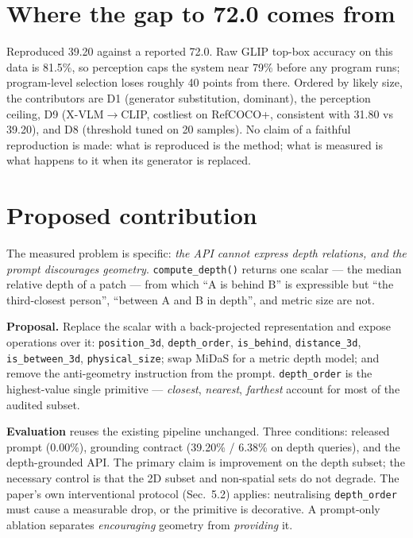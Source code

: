 \documentclass[11pt,a4paper]{article}
\begin{document}
\section{Where the gap to 72.0 comes from}

Reproduced 39.20 against a reported 72.0. Raw GLIP top-box accuracy on this data is
81.5\%, so perception caps the system near 79\% before any program runs; program-level
selection loses roughly 40 points from there. Ordered by likely size, the
contributors are D1 (generator substitution, dominant), the perception ceiling,
D9 (X-VLM$\rightarrow$CLIP, costliest on RefCOCO+, consistent with 31.80 vs 39.20),
and D8 (threshold tuned on 20 samples). No claim of a faithful reproduction is made:
what is reproduced is the method; what is measured is what happens to it when its
generator is replaced.

\section{Proposed contribution}

The measured problem is specific: \emph{the API cannot express depth relations, and
the prompt discourages geometry}. \texttt{compute\_depth()} returns one scalar --- the
median relative depth of a patch --- from which ``A is behind B'' is expressible but
``the third-closest person'', ``between A and B in depth'', and metric size are not.

\textbf{Proposal.} Replace the scalar with a back-projected representation and expose
operations over it: \texttt{position\_3d}, \texttt{depth\_order},
\texttt{is\_behind}, \texttt{distance\_3d}, \texttt{is\_between\_3d},
\texttt{physical\_size}; swap MiDaS for a metric depth model; and remove the
anti-geometry instruction from the prompt. \texttt{depth\_order} is the
highest-value single primitive --- \emph{closest}, \emph{nearest}, \emph{farthest}
account for most of the audited subset.

\textbf{Evaluation} reuses the existing pipeline unchanged. Three conditions:
released prompt (0.00\%), grounding contract (39.20\% / 6.38\% on depth queries), and
the depth-grounded API. The primary claim is improvement on the depth subset; the
necessary control is that the 2D subset and non-spatial sets do not degrade. The
paper's own interventional protocol (Sec.\ 5.2) applies: neutralising
\texttt{depth\_order} must cause a measurable drop, or the primitive is decorative.
A prompt-only ablation separates \emph{encouraging} geometry from \emph{providing} it.
\end{document}
